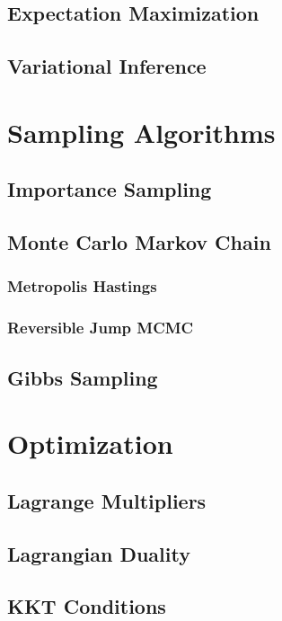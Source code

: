 \documentclass[12pt]{article}
\begin{document}
\subsection{Expectation Maximization}

\subsection{Variational Inference}

\section{Sampling Algorithms}

\subsection{Importance Sampling}

\subsection{Monte Carlo Markov Chain}

\subsubsection{Metropolis Hastings}

\subsubsection{Reversible Jump MCMC}

\subsection{Gibbs Sampling}

\section{Optimization}

\subsection{Lagrange Multipliers}

\subsection{Lagrangian Duality}

\subsection{KKT Conditions}
\end{document}
